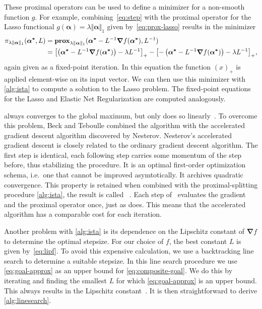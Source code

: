 These proximal operators can be used to define a minimizer for a non-smooth
function \(g\).
For example, combining~\autoref{eq:step} with the proximal operator for the
Lasso functional \(g(\bm{\alpha}) = \lambda \Vert \bm{\alpha} \Vert_1\) given by~\autoref{eq:prox-lasso} results in
the minimizer
\begin{align*}
  \pi_{\lambda \Vert \bm{\alpha} \Vert_1}(\bm{\alpha^*} ,L)
  &=  \prox[\(\lambda \Vert \bm{\alpha} \Vert_1\)]{\bm{\alpha^*} - L^{-1} \bm{\nabla} f (\bm{\alpha^*})}{L^{-1}} \\
  &= {\left[ \left(\bm{\alpha^*} - L^{-1} \bm{\nabla} f (\bm{\alpha^*}) \right) - \lambda L^{-1} \right]}_+ -
    {\left[ -\left(\bm{\alpha^*} - L^{-1} \bm{\nabla} f (\bm{\alpha^*}) \right) - \lambda L^{-1} \right]}_+,
\end{align*}
again given as a fixed-point iteration.
In this equation the function \( \left( x \right)_+ \) is applied element-wise on its input vector.
We can then use this minimizer with \autoref{alg:ista} to compute a solution to
the Lasso problem.
The fixed-point equations for the Lasso and Elastic Net Regularization are
computed analogously.

\ista always converges to the global maximum, but only does so linearly~\cite{fista}.
To overcome this problem, Beck and Teboulle combined the \ista algorithm with
the accelerated gradient descent algorithm discovered by Nesterov. 
Nesterov's accelerated gradient descent is closely related to the ordinary
gradient descent algorithm.
The first step is identical, each following step carries some momentum of the
step before, thus stabilizing the procedure.
It is an optimal first-order optimization schema, i.e.~one that cannot be
improved asymtotically.
It archives quadratic convergence.
This property is retained when combined with the proximal-splitting procedure \autoref{alg:ista}, the result is called \fista~\cite{fista}.
Each step of \fista\ evaluates the gradient and the proximal operator once, just as \ista does.
This means that the accelerated algorithm has a comparable cost for each iteration.

Another problem with \autoref{alg:ista} is its dependence on the Lipschitz constant of
\(\bm{\nabla} f\) to determine the optimal stepsize.
For our choice of \(f\), the best constant \(L\) is given by~\autoref{eq:lipf}.
To avoid this expensive calculation, we use a backtracking line search to
determine a suitable stepsize.
In this line search procedure we use \autoref{eq:goal-approx} as an upper bound for \autoref{eq:composite-goal}.
We do this by iterating and finding the smallest \(L\) for which
\autoref{eq:goal-approx} is an upper bound.
This always results in the Lipschitz constant~\cite{fista}.
It is then straightforward to derive \autoref{alg:linesearch}.

